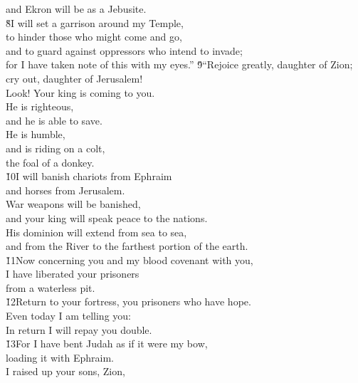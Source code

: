 \begin{poetry}
\poemlll       and Ekron will be as a Jebusite. \\
\poeml \v{8}I will set a garrison around my Temple, \\
\poemll    to hinder those who might come and go, \\
\poeml and to guard against oppressors who intend to invade; \\
\poemll    for I have taken note of this with my eyes.''
\poeml \v{9}``Rejoice greatly, daughter of Zion; \\
\poemll    cry out, daughter of Jerusalem! \\
\poeml Look! Your king is coming to you. \\
\poemll    He is righteous, \\
\poemlll       and he is able to save. \\
\poeml He is humble, \\
\poemll    and is riding on a colt, \\
\poemlll       the foal of a donkey. \\
\poeml \v{10}I will banish chariots from Ephraim \\
\poemll    and horses from Jerusalem. \\
\poeml War weapons will be banished, \\
\poemll    and your king will speak peace to the nations. \\
\poeml His dominion will extend from sea to sea, \\
\poemll    and from the River to the farthest portion of the earth. \\
\poeml \v{11}Now concerning you and my blood covenant with you, \\
\poemll    I have liberated your prisoners \\
\poemlll       from a waterless pit. \\
\poeml \v{12}Return to your fortress, you prisoners who have hope. \\
\poemll    Even today I am telling you: \\
\poemlll       In return I will repay you double. \\
\poeml \v{13}For I have bent Judah as if it were my bow, \\
\poemll    loading it with Ephraim. \\
\poeml I raised up your sons, Zion, \\

\end{poetry}
